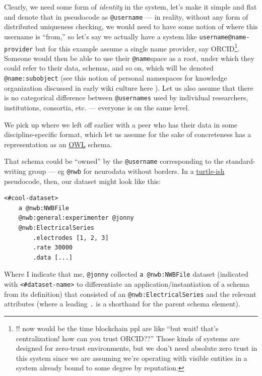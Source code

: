 \documentclass[notoc]{tufte-book}
\begin{document}
Clearly, we need some form of \emph{identity} in the system, let's make
it simple and flat and denote that in pseudocode as \texttt{@username}
--- in reality, without any form of distributed uniqueness checking, we
would need to have some notion of where this username is ``from,'' so
let's say we actually have a system like \texttt{username@name-provider}
but for this example assume a single name provider, say
ORCID\footnote{!! now would be the time blockchain ppl are like ``but
  wait! that's centralization! how can you trust ORCID??'' Those kinds
  of systems are designed for zero-trust environments, but we don't need
  absolute zero trust in this system since we are assuming we're
  operating with visible entities in a system already bound to some
  degree by reputation.}. Someone would then be able to use their
\texttt{@name}space as a root, under which they could refer to their
data, schemas, and so on, which will be denoted \texttt{@name:subobject}
(see this notion of personal namespaces for knowledge organization
discussed in early wiki culture here \citep{MeatballWikiPersonalCategories} ). Let us also assume that there is
no categorical difference between \texttt{@usernames} used by individual
researchers, institutions, consortia, etc. --- everyone is on the same
level.

We pick up where we left off earlier with a peer who has their data in
some discipline-specific format, which let us assume for the sake of
concreteness has a representation as an
\href{https://www.w3.org/OWL/}{OWL} schema.

That schema could be ``owned'' by the \texttt{@username} corresponding
to the standard-writing group --- eg \texttt{@nwb} for neurodata without
borders. In a \href{https://www.w3.org/TR/turtle/}{turtle-ish}
pseudocode, then, our dataset might look like this:

\begin{verbatim}
<#cool-dataset>
    a @nwb:NWBFile
    @nwb:general:experimenter @jonny
    @nwb:ElectricalSeries
        .electrodes [1, 2, 3]
        .rate 30000
        .data [...]
\end{verbatim}

Where I indicate that me, \texttt{@jonny} collected
\texttt{a\ @nwb:NWBFile} dataset (indicated with
\texttt{\textless{}\#dataset-name\textgreater{}} to differentiate an
application/instantiation of a schema from its definition) that
consisted of an \texttt{@nwb:ElectricalSeries} and the relevant
attributes (where a leading \texttt{.} is a shorthand for the parent
schema element).
\end{document}
